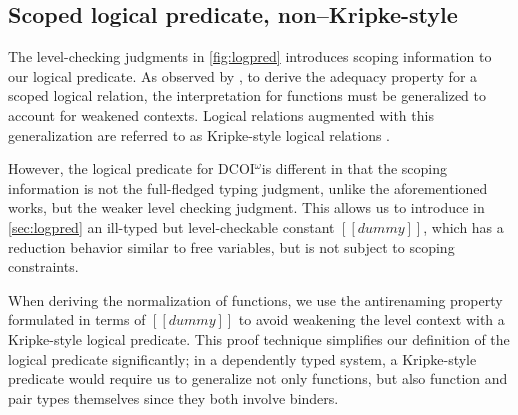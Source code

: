 \documentclass[acmsmall, screen=true, nonacm=true,
  review=\ifpublic false\else true\fi,
  anonymous=\ifanonymous true\else false\fi
]{acmart}
\makeatletter
\newcommand{\name}{\texorpdfstring{DCOI$^{\omega}$\@\xspace}{DCOI-omega}}
\makeatother
\begin{document}

\ifextended
\subsection{Scoped logical predicate, non--Kripke-style}
\label{sec:nokripke}


The level-checking judgments in \cref{fig:logpred} introduces scoping information to our
logical predicate. As observed by \citet{abel:normalization}, to
derive the adequacy property for a scoped logical relation, the
interpretation for functions must be generalized to account for
weakened contexts. Logical relations augmented with this
generalization are referred to as Kripke-style logical relations
\citep{abel:poplmark, abel:irrelevance, adjedj:mltt-coq, harper:equivalence}.

However, the logical predicate for \name is different in that the
scoping information is not the full-fledged typing judgment, unlike
the aforementioned works, but the weaker level checking judgment. This
allows us to introduce in \cref{sec:logpred} an ill-typed but
level-checkable constant $[[dummy]]$, which has a reduction behavior similar
to free variables, but is not subject to scoping constraints.

When deriving the normalization of functions, we use the antirenaming
property formulated in terms of $[[dummy]]$ to avoid weakening the level
context with a Kripke-style logical predicate. This proof technique
simplifies our definition of the logical predicate significantly; in a
dependently typed system, a Kripke-style predicate would require us to
generalize not only functions, but also function and pair types themselves
since they both involve binders.
\fi
\end{document}
